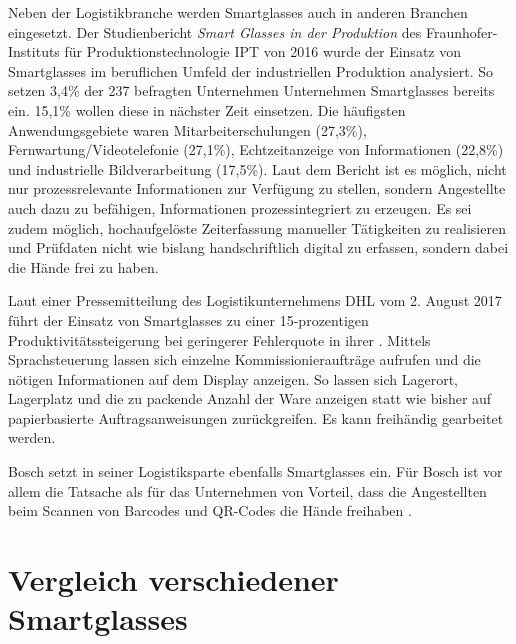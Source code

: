Neben der Logistikbranche werden Smartglasses auch in anderen Branchen eingesetzt. Der Studienbericht \emph{Smart Glasses in der Produktion} des Fraunhofer-Instituts für Produktionstechnologie IPT von 2016 \cite{Plutz} wurde der Einsatz von Smartglasses im beruflichen Umfeld der industriellen Produktion analysiert. So setzen 3,4\% der 237 befragten Unternehmen Unternehmen Smartglasses bereits ein. 15,1\% wollen diese in nächster Zeit einsetzen. Die häufigsten Anwendungsgebiete waren Mitarbeiterschulungen (27,3\%), Fernwartung/Videotelefonie (27,1\%), Echtzeitanzeige von Informationen (22,8\%) und industrielle Bildverarbeitung (17,5\%). Laut dem Bericht ist es möglich, nicht nur 
prozessrelevante Informationen zur Verfügung zu stellen, sondern Angestellte auch dazu zu befähigen, Informationen prozessintegriert zu erzeugen. Es sei zudem möglich, hochaufgelöste Zeiterfassung manueller Tätigkeiten zu realisieren und Prüfdaten nicht wie bislang handschriftlich digital zu erfassen, sondern dabei die Hände frei zu haben.

Laut einer Pressemitteilung des Logistikunternehmens DHL vom 2. August 2017 führt der Einsatz von Smartglasses zu einer 15-prozentigen Produktivitätssteigerung bei geringerer Fehlerquote in ihrer \cite{DeutschePostDHLGroup2017}. Mittels Sprachsteuerung lassen sich einzelne Kommissionieraufträge aufrufen und die nötigen Informationen auf dem Display anzeigen. So lassen sich Lagerort, Lagerplatz und die zu packende Anzahl der Ware anzeigen statt wie bisher auf papierbasierte Auftragsanweisungen zurückgreifen. Es kann freihändig gearbeitet werden.

Bosch setzt in seiner Logistiksparte ebenfalls Smartglasses ein. Für Bosch ist vor allem die Tatsache als für das Unternehmen von Vorteil, dass die Angestellten beim Scannen von Barcodes und QR-Codes die Hände freihaben \cite{Spinger2014}. 
%
%
\section{Vergleich verschiedener Smartglasses}
